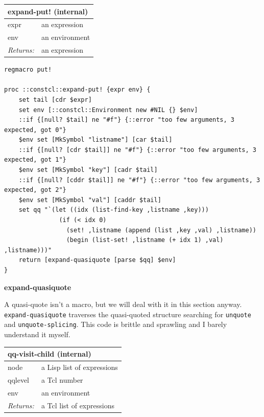 \documentclass[twoside,9pt]{report}
\begin{document}
\begin{tabular}{ |l l| }
\hline
\multicolumn{2}{|l|}{expand-put! (internal)} \\
\hline
expr & an expression \\
env & an environment \\
\textit{Returns:} & an expression \\
\hline
\end{tabular}

\noindent\makebox[\linewidth]{\rule{\linewidth}{0.4pt}}
\begin{lstlisting}
regmacro put!
 
proc ::constcl::expand-put! {expr env} {
    set tail [cdr $expr]
    set env [::constcl::Environment new #NIL {} $env]
    ::if {[null? $tail] ne "#f"} {::error "too few arguments, 3 expected, got 0"}
    $env set [MkSymbol "listname"] [car $tail]
    ::if {[null? [cdr $tail]] ne "#f"} {::error "too few arguments, 3 expected, got 1"}
    $env set [MkSymbol "key"] [cadr $tail]
    ::if {[null? [cddr $tail]] ne "#f"} {::error "too few arguments, 3 expected, got 2"}
    $env set [MkSymbol "val"] [caddr $tail]
    set qq "`(let ((idx (list-find-key ,listname ,key)))
               (if (< idx 0)
                 (set! ,listname (append (list ,key ,val) ,listname))
                 (begin (list-set! ,listname (+ idx 1) ,val) ,listname)))"
    return [expand-quasiquote [parse $qq] $env]
}
\end{lstlisting}
\noindent\makebox[\linewidth]{\rule{\linewidth}{0.4pt}}

\textbf{expand-quasiquote}


A quasi-quote isn't a macro, but we will deal with it in this section anyway. \texttt{expand-quasiquote} traverses the quasi-quoted structure searching for \texttt{unquote} and \texttt{unquote-splicing}. This code is brittle and sprawling and I barely understand it myself.

\begin{tabular}{ |l l| }
\hline
\multicolumn{2}{|l|}{qq-visit-child (internal)} \\
\hline
node & a Lisp list of expressions \\
qqlevel & a Tcl number \\
env & an environment \\
\textit{Returns:} & a Tcl list of expressions \\
\hline
\end{tabular}
\end{document}
